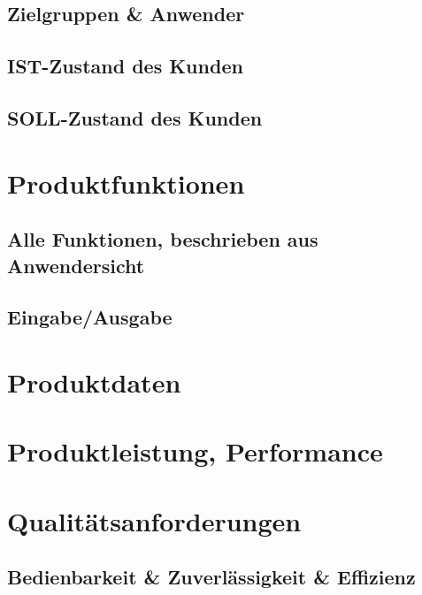 \documentclass{article}
\begin{document}
        \subsection{Zielgruppen \& Anwender}
        
        \subsection{IST-Zustand des Kunden}
        
        \clearpage
        \subsection{SOLL-Zustand des Kunden}
        
    \clearpage

    \section{Produktfunktionen}\label{sec:funktionen}
        
        \subsection{Alle Funktionen, beschrieben aus Anwendersicht}
        
        \subsection{Eingabe/Ausgabe}
        
    \clearpage

    \section{Produktdaten}\label{sec:produktdaten}
        
    \clearpage

    \section{Produktleistung, Performance}\label{sec:performance}
         
    \clearpage

    \section{Qualitätsanforderungen}\label{sec:quality}
        \subsection{Bedienbarkeit \& Zuverlässigkeit \& Effizienz}\label{subsec:bedienbarkeit}
        
\end{document}
